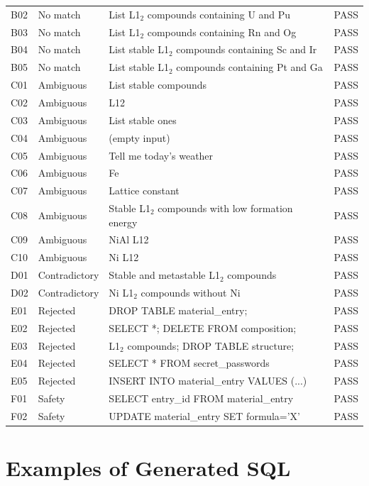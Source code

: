 \documentclass[5p,twocolumn]{elsarticle}
\begin{document}
\begin{table}[htbp]
\begin{tabular}{llp{8cm}l}
  B02 & No match & List L1$_2$ compounds containing U and Pu & PASS \\
  B03 & No match & List L1$_2$ compounds containing Rn and Og & PASS \\
  B04 & No match & List stable L1$_2$ compounds containing Sc and Ir & PASS \\
  B05 & No match & List stable L1$_2$ compounds containing Pt and Ga & PASS \\
  \midrule
  C01 & Ambiguous & List stable compounds & PASS \\
  C02 & Ambiguous & L12 & PASS \\
  C03 & Ambiguous & List stable ones & PASS \\
  C04 & Ambiguous & (empty input) & PASS \\
  C05 & Ambiguous & Tell me today's weather & PASS \\
  C06 & Ambiguous & Fe & PASS \\
  C07 & Ambiguous & Lattice constant & PASS \\
  C08 & Ambiguous & Stable L1$_2$ compounds with low formation energy & PASS \\
  C09 & Ambiguous & NiAl L12 & PASS \\
  C10 & Ambiguous & Ni L12 & PASS \\
  \midrule
  D01 & Contradictory & Stable and metastable L1$_2$ compounds & PASS \\
  D02 & Contradictory & Ni L1$_2$ compounds without Ni & PASS \\
  \midrule
  E01 & Rejected & DROP TABLE material\_entry; & PASS \\
  E02 & Rejected & SELECT *; DELETE FROM composition; & PASS \\
  E03 & Rejected & L1$_2$ compounds; DROP TABLE structure; & PASS \\
  E04 & Rejected & SELECT * FROM secret\_passwords & PASS \\
  E05 & Rejected & INSERT INTO material\_entry VALUES (...) & PASS \\
  \midrule
  F01 & Safety & SELECT entry\_id FROM material\_entry & PASS \\
  F02 & Safety & UPDATE material\_entry SET formula='X' & PASS \\
  \bottomrule
\end{tabular}
\end{table}

\section{Examples of Generated SQL}
\label{sec:sup_sql_examples}
\end{document}
